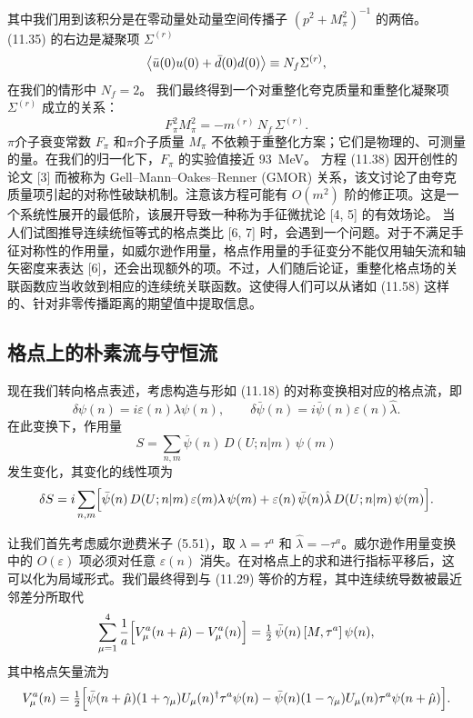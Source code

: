 其中我们用到该积分是在零动量处动量空间传播子 $(p^2 + M_\pi^2)^{-1}$ 的两倍。
(11.35) 的右边是凝聚项 $\Sigma^{(r)}$
\begin{equation}
\left\langle \bar{u}(0)u(0) + \bar{d}(0)d(0) \right\rangle \equiv N_f \Sigma^{(r)} ,
\end{equation}
在我们的情形中 $N_f = 2$。
我们最终得到一个对重整化夸克质量和重整化凝聚项 $\Sigma^{(r)}$ 成立的关系：
\begin{equation}
F_\pi^2 M_\pi^2 = -m^{(r)}\, N_f\, \Sigma^{(r)} .
\end{equation}
$\pi$介子衰变常数 $F_\pi$ 和$\pi$介子质量 $M_\pi$ 不依赖于重整化方案；它们是物理的、可测量的量。在我们的归一化下，$F_\pi$ 的实验值接近 93~MeV。
方程 (11.38) 因开创性的论文 [3] 而被称为 Gell–Mann–Oakes–Renner (GMOR) 关系，该文讨论了由夸克质量项引起的对称性破缺机制。注意该方程可能有 $O(m^2)$ 阶的修正项。这是一个系统性展开的最低阶，该展开导致一种称为手征微扰论 [4, 5] 的有效场论。
当人们试图推导连续统恒等式的格点类比 [6, 7] 时，会遇到一个问题。对于不满足手征对称性的作用量，如威尔逊作用量，格点作用量的手征变分不能仅用轴矢流和轴矢密度来表达 [6]，还会出现额外的项。不过，人们随后论证，重整化格点场的关联函数应当收敛到相应的连续统关联函数。这使得人们可以从诸如 (11.58) 这样的、针对非零传播距离的期望值中提取信息。

\subsection{格点上的朴素流与守恒流}
\label{sec:naivecurrents}
现在我们转向格点表述，考虑构造与形如 (11.18) 的对称变换相对应的格点流，即
\begin{equation}
\delta\psi(n) = i\varepsilon(n)\lambda\psi(n) , \qquad
\delta\bar{\psi}(n) = i\bar{\psi}(n)\varepsilon(n)\hat{\lambda} .
\end{equation}
在此变换下，作用量
\begin{equation}
S = \sum_{n,m} \bar{\psi}(n)\, D(U; n|m)\, \psi(m)
\end{equation}
发生变化，其变化的线性项为
\begin{equation}
\delta S = i \sum_{n,m}
\Bigl[\bar{\psi}(n)\, D(U; n|m)\, \varepsilon(m)\lambda\, \psi(m)
+ \varepsilon(n)\,\bar{\psi}(n)\hat{\lambda}\, D(U; n|m)\, \psi(m)\Bigr] .
\end{equation}

让我们首先考虑威尔逊费米子 (5.51)，取 $\lambda = \tau^a$ 和 $\hat{\lambda} = -\tau^a$。威尔逊作用量变换中的 $O(\varepsilon)$ 项必须对任意 $\varepsilon(n)$ 消失。在对格点上的求和进行指标平移后，这可以化为局域形式。我们最终得到与 (11.29) 等价的方程，其中连续统导数被最近邻差分所取代
\begin{equation}
\sum_{\mu=1}^{4} \frac{1}{a}\Bigl[V_\mu^a(n + \hat{\mu}) - V_\mu^a(n)\Bigr]
= \tfrac{1}{2}\,\bar{\psi}(n)\,[M, \tau^a]\,\psi(n) ,
\end{equation}
其中格点矢量流为
\begin{equation}
V_\mu^a(n) = \tfrac{1}{2} \Bigl[
\bar{\psi}(n + \hat{\mu})(1 + \gamma_\mu)U_\mu(n)^\dagger\tau^a\psi(n)
- \bar{\psi}(n)(1 - \gamma_\mu)U_\mu(n)\tau^a\psi(n + \hat{\mu})
\Bigr] .
\end{equation}

